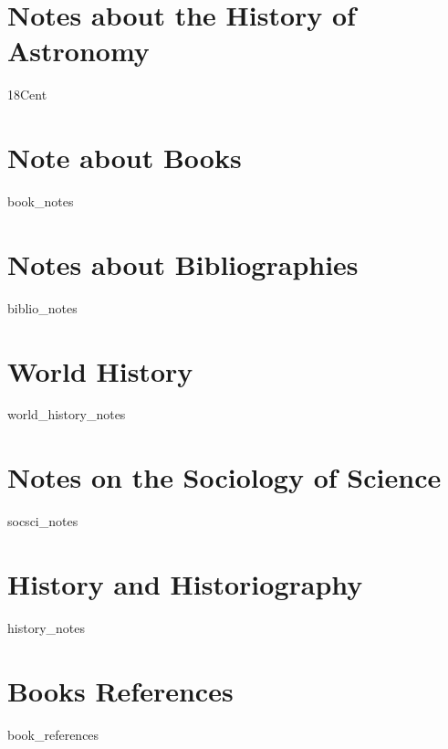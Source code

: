 \documentclass{book}
\begin{document}
\section{Notes about the History of Astronomy}
{18Cent}

\section{Note about Books}
{book_notes}

\section{Notes about Bibliographies}
{biblio_notes}

\section{World History}
{world_history_notes}


\section{Notes on the Sociology of Science}
{socsci_notes}

\section{History and Historiography}
{history_notes}

\section{Books References}
{book_references}

\printbibliography
\end{document}
